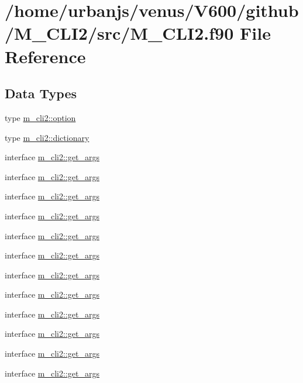 \hypertarget{M__CLI2_8f90}{}\section{/home/urbanjs/venus/\+V600/github/\+M\+\_\+\+C\+L\+I2/src/\+M\+\_\+\+C\+L\+I2.f90 File Reference}
\label{M__CLI2_8f90}
\subsection*{Data Types}
\begin{DoxyCompactItemize}
\item 
type \mbox{\hyperlink{structm__cli2_1_1option}{m\+\_\+cli2\+::option}}
\item 
type \mbox{\hyperlink{structm__cli2_1_1dictionary}{m\+\_\+cli2\+::dictionary}}
\item 
interface \mbox{\hyperlink{interfacem__cli2_1_1get__args}{m\+\_\+cli2\+::get\+\_\+args}}
\item 
interface \mbox{\hyperlink{interfacem__cli2_1_1get__args}{m\+\_\+cli2\+::get\+\_\+args}}
\item 
interface \mbox{\hyperlink{interfacem__cli2_1_1get__args}{m\+\_\+cli2\+::get\+\_\+args}}
\item 
interface \mbox{\hyperlink{interfacem__cli2_1_1get__args}{m\+\_\+cli2\+::get\+\_\+args}}
\item 
interface \mbox{\hyperlink{interfacem__cli2_1_1get__args}{m\+\_\+cli2\+::get\+\_\+args}}
\item 
interface \mbox{\hyperlink{interfacem__cli2_1_1get__args}{m\+\_\+cli2\+::get\+\_\+args}}
\item 
interface \mbox{\hyperlink{interfacem__cli2_1_1get__args}{m\+\_\+cli2\+::get\+\_\+args}}
\item 
interface \mbox{\hyperlink{interfacem__cli2_1_1get__args}{m\+\_\+cli2\+::get\+\_\+args}}
\item 
interface \mbox{\hyperlink{interfacem__cli2_1_1get__args}{m\+\_\+cli2\+::get\+\_\+args}}
\item 
interface \mbox{\hyperlink{interfacem__cli2_1_1get__args}{m\+\_\+cli2\+::get\+\_\+args}}
\item 
interface \mbox{\hyperlink{interfacem__cli2_1_1get__args}{m\+\_\+cli2\+::get\+\_\+args}}
\item 
interface \mbox{\hyperlink{interfacem__cli2_1_1get__args}{m\+\_\+cli2\+::get\+\_\+args}}

\end{DoxyCompactItemize}
